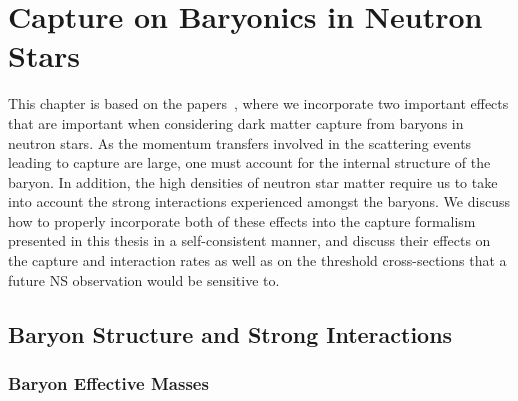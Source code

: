 \graphicspath{{img/capture_baryons/}}
\chapter{Capture on Baryonics in Neutron Stars}
\label{chapter:capture_baryons}

\begin{synopsis}
   This chapter is based on the papers~\cite{Bell:2020obw_sep_NucleonStructureStrong,Anzuini:2021lnv_nov_Improvedtreatmentdark}, where we incorporate two important effects that are important when considering dark matter capture from baryons in neutron stars. 
   As the momentum transfers involved in the scattering events leading to capture are large, one must account for the internal structure of the baryon. In addition, the high densities of neutron star matter require us to take into account the strong interactions experienced amongst the baryons. We discuss how to properly incorporate both of these effects into the capture formalism presented in this thesis in a self-consistent manner, and discuss their effects on the capture and interaction rates as well as on the threshold cross-sections that a future NS observation would be sensitive to. 
\end{synopsis}

\section{Baryon Structure and Strong Interactions}
\label{ch5:sec:baryons_in_NSs}

\subsection{Baryon Effective Masses}
\label{ch5:subsec:strong_ints_meffs}

